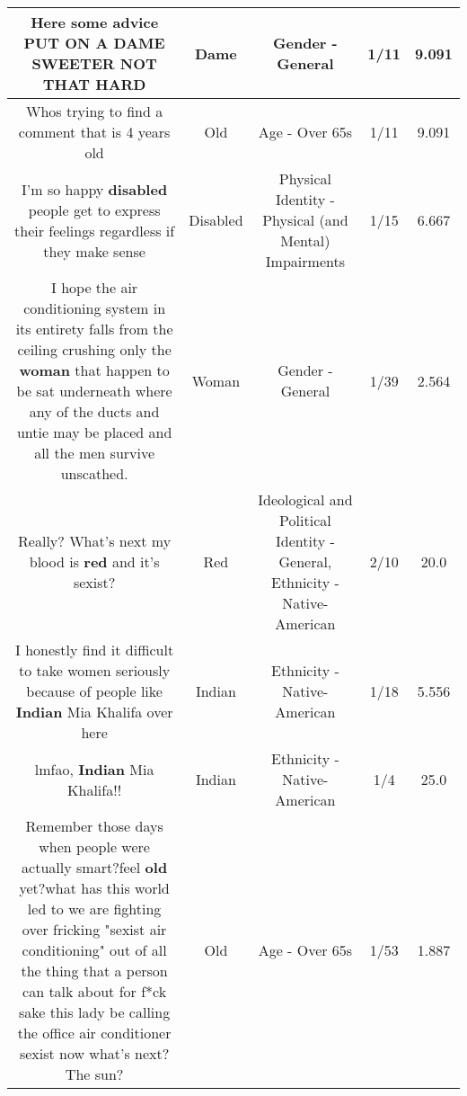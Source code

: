 \documentclass[11pt]{article}
\newlength\mylength
\begin{document}
\begin{center}
\begin{longtable}{|C{.65\mylength}|C{.30\mylength}|C{.12\mylength}|C{.12\mylength}|C{.12\mylength}|}
  \small Here some advice PUT ON A \textbf{DAME} SWEETER NOT THAT HARD\normalsize   & Dame & Gender - General & 1/11 & 9.091 \\  \hline
  \small Whos trying to find a comment that is 4 years old\normalsize   & Old & Age - Over 65s & 1/11 & 9.091 \\  \hline
  \small I'm so happy \textbf{disabled} people get to express their feelings regardless if they make sense\normalsize   & Disabled & Physical Identity - Physical (and Mental) Impairments & 1/15 & 6.667 \\  \hline
  \small I hope the air conditioning system in its entirety falls from the ceiling crushing only the \textbf{woman} that happen to be sat underneath where any of the ducts and untie may be placed and all the men survive unscathed.\normalsize   & Woman & Gender - General & 1/39 & 2.564 \\  \hline
  \small Really? What's next my blood is \textbf{r\textbf{ed}} and it's sexist?\normalsize   & Red &  Ideological and Political Identity - General, Ethnicity - Native-American & 2/10 & 20.0 \\  \hline
  \small I honestly find it difficult to take women seriously because of people like \textbf{Indian} Mia Khalifa over here\normalsize   & Indian & Ethnicity - Native-American & 1/18 & 5.556 \\  \hline
  \small lmfao, \textbf{Indian} Mia Khalifa!!\normalsize   & Indian & Ethnicity - Native-American & 1/4 & 25.0 \\  \hline
  \small Remember those days when people were actually smart?feel \textbf{old} yet?what has this world led to we are fighting over fricking "sexist air conditioning" out of all the thing that a person can talk about for f*ck sake this lady be calling the office air conditioner sexist now what's next? The sun?\normalsize   & Old & Age - Over 65s & 1/53 & 1.887 \\  \hline

\end{longtable}
\end{center}
\end{document}
